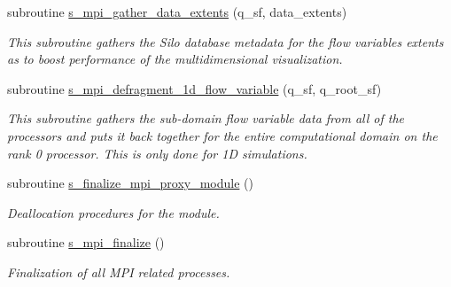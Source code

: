 \begin{Indent}
\begin{DoxyCompactItemize}
subroutine \hyperlink{namespacem__mpi__proxy_a0b226acd5a9097566685604292c3ae0d}{s\+\_\+mpi\+\_\+gather\+\_\+data\+\_\+extents} (q\+\_\+sf, data\+\_\+extents)
\begin{DoxyCompactList}\small\item\em This subroutine gathers the Silo database metadata for the flow variable\textquotesingle{}s extents as to boost performance of the multidimensional visualization. \end{DoxyCompactList}\item 
subroutine \hyperlink{namespacem__mpi__proxy_ae5286531f6390643aad1e4db5d5f6d91}{s\+\_\+mpi\+\_\+defragment\+\_\+1d\+\_\+flow\+\_\+variable} (q\+\_\+sf, q\+\_\+root\+\_\+sf)
\begin{DoxyCompactList}\small\item\em This subroutine gathers the sub-\/domain flow variable data from all of the processors and puts it back together for the entire computational domain on the rank 0 processor. This is only done for 1D simulations. \end{DoxyCompactList}\item 
subroutine \hyperlink{namespacem__mpi__proxy_ac984c84fe4140876d6600250af9807da}{s\+\_\+finalize\+\_\+mpi\+\_\+proxy\+\_\+module} ()
\begin{DoxyCompactList}\small\item\em Deallocation procedures for the module. \end{DoxyCompactList}\item 
subroutine \hyperlink{namespacem__mpi__proxy_a43fbda10c02ec8bc1fc572c83090f2e5}{s\+\_\+mpi\+\_\+finalize} ()
\begin{DoxyCompactList}\small\item\em Finalization of all M\+PI related processes. \end{DoxyCompactList}\end{DoxyCompactItemize}
\end{Indent}

